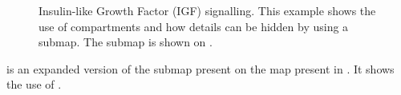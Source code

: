 \begin{figure}[t]
\begin{center}
\caption{Insulin-like Growth Factor (IGF) signalling. This example shows the use of compartments and how details can be hidden by using a submap. The submap is shown on .}\label{fig:insulin}
\end{center}
\end{figure}

 is an expanded version of the submap present on the map present in . It shows the use of .

